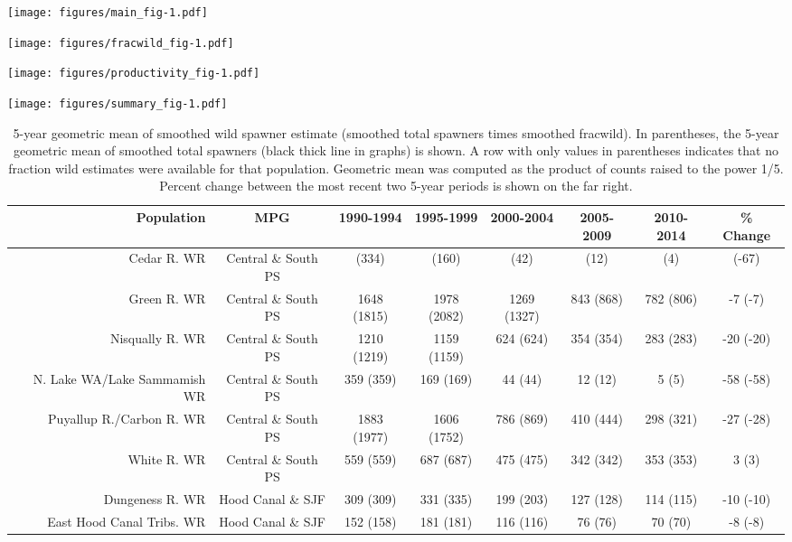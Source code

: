 \documentclass[]{article}
\title{}
\author{}
\date{}
\begin{document}
\renewcommand{\floatpagefraction}{0.7}\renewcommand{\dblfloatpagefraction}{0.7}

\texttt{[image: figures/main\_fig-1.pdf]}

\newpage

\texttt{[image: figures/fracwild\_fig-1.pdf]}

\newpage

\texttt{[image: figures/productivity\_fig-1.pdf]}

\newpage

\texttt{[image: figures/summary\_fig-1.pdf]}

\newpage

\begin{landscape}\begin{table}[p]
\centering
\caption{5-year geometric mean of smoothed wild spawner estimate (smoothed total spawners times smoothed fracwild).  In parentheses, the 5-year geometric mean of smoothed total spawners (black thick line in graphs) is shown.  A row with only values in parentheses indicates that no fraction wild estimates were available for that population. Geometric mean was computed as the product of counts raised to the power 1/5. Percent change between the most recent two 5-year periods is shown on the far right.} 
\begin{tabular}{r|c|cccccc}
  \hline
Population & MPG & 1990-1994 & 1995-1999 & 2000-2004 & 2005-2009 & 2010-2014 & \% Change \\ 
  \hline
Cedar R. WR & Central \& South PS &  (334) &  (160) &  (42) &  (12) &  (4) &  (-67) \\ 
  Green R. WR & Central \& South PS & 1648 (1815) & 1978 (2082) & 1269 (1327) & 843 (868) & 782 (806) & -7 (-7) \\ 
  Nisqually R. WR & Central \& South PS & 1210 (1219) & 1159 (1159) & 624 (624) & 354 (354) & 283 (283) & -20 (-20) \\ 
  N. Lake WA/Lake Sammamish WR & Central \& South PS & 359 (359) & 169 (169) & 44 (44) & 12 (12) & 5 (5) & -58 (-58) \\ 
  Puyallup R./Carbon R. WR & Central \& South PS & 1883 (1977) & 1606 (1752) & 786 (869) & 410 (444) & 298 (321) & -27 (-28) \\ 
  White R. WR & Central \& South PS & 559 (559) & 687 (687) & 475 (475) & 342 (342) & 353 (353) & 3 (3) \\ 
  Dungeness R. WR & Hood Canal \& SJF & 309 (309) & 331 (335) & 199 (203) & 127 (128) & 114 (115) & -10 (-10) \\ 
  East Hood Canal Tribs. WR & Hood Canal \& SJF & 152 (158) & 181 (181) & 116 (116) & 76 (76) & 70 (70) & -8 (-8) \\ 

\end{tabular}
\end{table}
\end{landscape}
\end{document}
